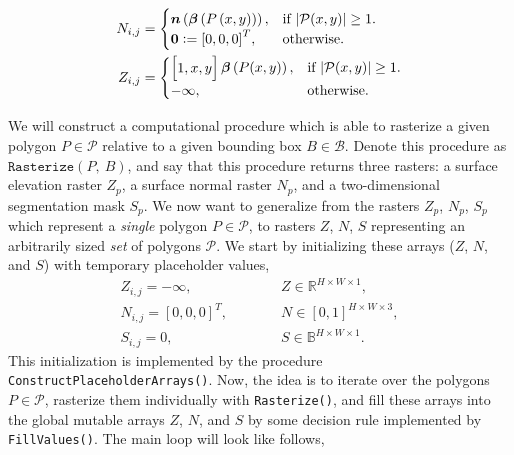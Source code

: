 \begin{align*}
  N_{i,j} &= \begin{cases}
    \boldsymbol{n}\left(\boldsymbol{\beta}\left(P\left(x, y\right)\right)\right), &\text{if $|\mathcal{P}(x,y)| \geq 1$}.\\
    \boldsymbol{0} \vcentcolon= {[0, 0, 0]}^T, &\text{otherwise.}
  \end{cases}
  \\
  Z_{i,j} &= \begin{cases}
    \begin{bmatrix}1, x, y\end{bmatrix} \boldsymbol{\beta}\left(P(x, y)\right), &\text{if } |\mathcal{P}(x,y)| \geq 1.\\
    -\infty, &\text{otherwise}.
  \end{cases}
\end{align*}

We will construct a computational procedure which is able to rasterize a given polygon $P \in \mathcal{P}$ relative to a given bounding box $B \in \mathcal{B}$.
Denote this procedure as $\texttt{Rasterize}(P,~B)$, and say that this procedure returns three rasters: a surface elevation raster $Z_p$, a surface normal raster $N_p$, and a two-dimensional segmentation mask $S_p$.
We now want to generalize from the rasters $Z_p$, $N_p$, $S_p$ which represent a \textit{single} polygon $P \in \mathcal{P}$, to rasters $Z$, $N$, $S$ representing an arbitrarily sized \emph{set} of polygons $\mathcal{P}$.
We start by initializing these arrays ($Z$, $N$, and $S$) with temporary placeholder values,
\begin{align*}
  Z_{i,j} = -\infty, \hspace{3em} &Z \in \mathbb{R}^{H \times W \times 1}, \\
  N_{i,j} = {[0, 0, 0]}^T, \hspace{3em} &N \in [0, 1]^{H \times W \times 3}, \\
  S_{i,j} = 0, \hspace{3em} &S \in \mathbb{B}^{H \times W \times 1}.
\end{align*}
This initialization is implemented by the procedure \texttt{ConstructPlaceholderArrays()}.
Now, the idea is to iterate over the polygons $P \in \mathcal{P}$, rasterize them individually with \texttt{Rasterize()}, and fill these arrays into the global mutable arrays $Z$, $N$, and $S$ by some decision rule implemented by \texttt{FillValues()}.
The main loop will look like follows,
